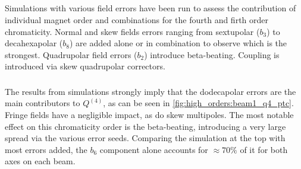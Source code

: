 \subsection{}

Simulations with various field errors have been run to assess the contribution of individual magnet
order and combinations for the fourth and firth order chromaticity. Normal and skew fields errors
ranging from sextupolar ($b_3$) to decahexapolar ($b_8$) are added alone or in combination to
observe which is the strongest. Quadrupolar field errors ($b_2$) introduce beta-beating. Coupling is
introduced via skew quadrupolar correctors.


\subsubsection{}

The results from simulations strongly imply that the dodecapolar errors are the main contributors
to $Q^{(4)}$, as can be seen in \cref{fig:high_orders:beam1_q4_ptc}.
Fringe fields have a negligible impact, as do skew multipoles.
The most notable effect on this chromaticity order is the beta-beating, introducing a very large
spread via the various error seeds.
Comparing the simulation at the top with most errors added, the $b_6$ component alone accounts for
$\approx 70\%$ of it for both axes on each beam.

